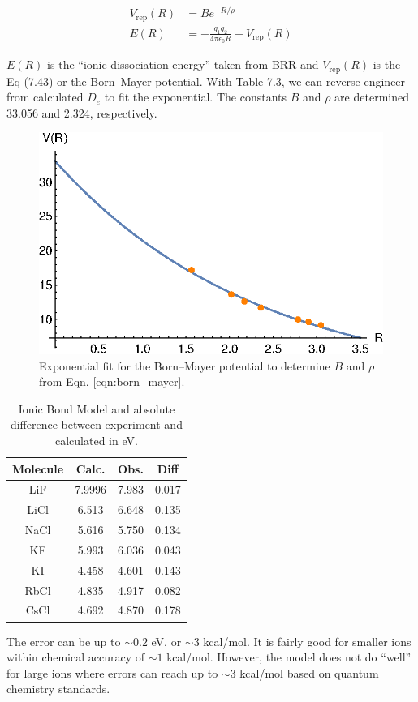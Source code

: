 \documentclass{article}
\begin{document}
  {\color{blue}
  \begin{align}
    V_{\text{rep}}(R) & = Be^{-R/\rho} \label{eqn:born_mayer}\\
    E(R) & = -\frac{q_1q_2}{4\pi\epsilon_0R} + V_{\text{rep}}(R)
    \label{eqn:dissociation}
  \end{align}

  $E(R)$ is the ``ionic dissociation energy'' taken from BRR and $V_{\text{rep}}(R)$ is
  the Eq (7.43) or the Born--Mayer potential. With Table 7.3, we can reverse engineer
  from calculated $D_e$ to fit the exponential. The constants $B$ and $\rho$ are
  determined 33.056 and 2.324, respectively.

  \begin{figure}[H]
    \centering
    \includegraphics[scale=1]{fitted_rhoB.eps}
    \caption{Exponential fit for the Born--Mayer potential to determine $B$ and
      $\rho$ from Eqn. \eqref{eqn:born_mayer}.}
    \label{fig:fit}
  \end{figure}
  
  \begin{table}[H]
    \centering
    \caption{Ionic Bond Model and absolute difference between experiment and calculated
      in eV.}
    \begin{tabular}{cccc}
      Molecule & Calc. & Obs. & Diff \\
      \hline
      LiF  & 7.9996 & 7.983 & 0.017 \\
      LiCl & 6.513  & 6.648 & 0.135 \\
      NaCl & 5.616  & 5.750 & 0.134 \\
      KF   & 5.993  & 6.036 & 0.043 \\
      KI   & 4.458  & 4.601 & 0.143 \\
      RbCl & 4.835  & 4.917 & 0.082 \\
      CsCl & 4.692  & 4.870 & 0.178
    \end{tabular}
  \end{table}
  
  The error can be up to $\sim 0.2$ eV, or $\sim 3$ kcal/mol. It is fairly good for smaller
  ions within chemical accuracy of $\sim 1$ kcal/mol. However, the model does not do ``well''
  for large ions where errors can reach up to $\sim 3$ kcal/mol based on quantum chemistry
  standards.}
\end{document}
